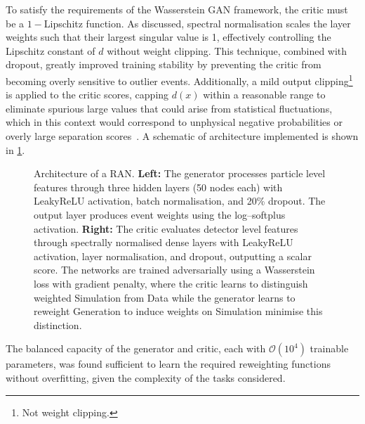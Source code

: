 {{        To satisfy the requirements of the Wasserstein GAN framework, the critic must be a \(1-\)Lipschitz function.
        As discussed, spectral normalisation scales the layer weights such that their largest singular value is 1, effectively controlling the Lipschitz constant of $d$ without weight clipping.
        This technique, combined with dropout, greatly improved training stability by preventing the critic from becoming overly sensitive to outlier events.
        Additionally, a mild output clipping\footnote{Not weight clipping.} is applied to the critic scores, capping $d(x)$ within a reasonable range to eliminate spurious large values that could arise from statistical fluctuations, which in this context would correspond to unphysical negative probabilities or overly large separation scores~\cite{dai_rethinking_2022, arjovsky_wasserstein_2017}.
        A schematic of architecture implemented is shown in \cref{fig:model-arch}.
        
\begin{figure}
    \centering
    \resizebox{0.75\linewidth}{!}{}
    \caption[RAN architecture with generator and critic networks]{\small Architecture of a RAN. 
    \textbf{Left:} The generator processes particle level features through three hidden layers (50 nodes each) with LeakyReLU activation, batch normalisation, and 20\% dropout. The output layer produces event weights using the log--softplus activation.
    \textbf{Right:} The critic evaluates detector level features through spectrally normalised dense layers with LeakyReLU activation, layer normalisation, and dropout, outputting a scalar score.
    The networks are trained adversarially using a Wasserstein loss with gradient penalty, where the critic learns to distinguish weighted Simulation from Data while the generator learns to reweight Generation to induce weights on Simulation minimise this distinction.}
    \label{fig:model-arch}
\end{figure}

        The balanced capacity of the generator and critic, each with $\mathcal{O}(10^4)$ trainable parameters, was found sufficient to learn the required reweighting functions without overfitting, given the complexity of the tasks considered.

}}
